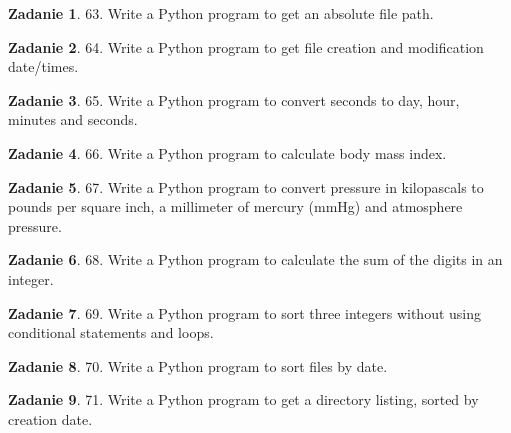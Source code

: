 \documentclass[11pt]{article}
\theoremstyle{definition}
\newtheorem{zadanie}{Zadanie}
\begin{document}
\begin{zadanie}


63. Write a Python program to get an absolute file path. 

\end{zadanie}

\begin{zadanie}


64. Write a Python program to get file creation and modification date/times. 

\end{zadanie}

\begin{zadanie}


65. Write a Python program to convert seconds to day, hour, minutes and seconds. 

\end{zadanie}

\begin{zadanie}


66. Write a Python program to calculate body mass index. 

\end{zadanie}

\begin{zadanie}


67. Write a Python program to convert pressure in kilopascals to pounds per square inch, a millimeter of mercury (mmHg) and atmosphere pressure. 

\end{zadanie}

\begin{zadanie}


68. Write a Python program to calculate the sum of the digits in an integer. 

\end{zadanie}

\begin{zadanie}


69. Write a Python program to sort three integers without using conditional statements and loops. 

\end{zadanie}

\begin{zadanie}


70. Write a Python program to sort files by date. 

\end{zadanie}

\begin{zadanie}


71. Write a Python program to get a directory listing, sorted by creation date. 

\end{zadanie}
\end{document}
